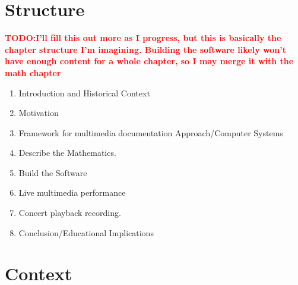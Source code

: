 \documentclass{tufte-book}
\newcommand{\TODO}[1]{\textcolor{red}{\bf TODO:#1}\xspace}
\begin{document}
\section{Structure}
\label{sec:structure}
\TODO{I'll fill this out more as I progress, but this is basically the
  chapter structure I'm imagining. Building the software likely won't
  have enough content for a whole chapter, so I may merge it with the
  math chapter}
\begin{enumerate}
\item Introduction and  Historical Context %
\item Motivation
\item Framework for multimedia documentation Approach/Computer Systems
\item Describe the Mathematics. %
\item Build the Software
\item Live multimedia performance
\item Concert playback recording. 
\item Conclusion/Educational Implications
\end{enumerate}

\section{Context}
\label{sec:context}
\end{document}
